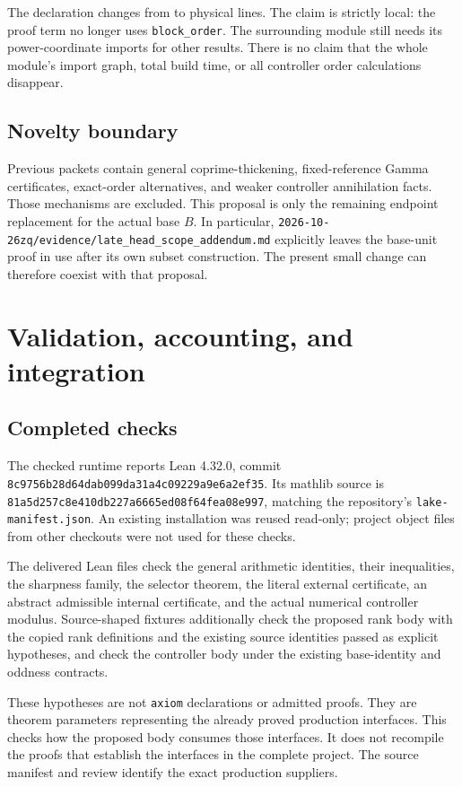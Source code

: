 \documentclass[11pt]{article}
\newcommand{\code}[1]{\nolinkurl{#1}}
\begin{document}
The declaration changes from \UnitOld{} to \UnitNew{} physical lines. The
claim is strictly local: the proof term no longer uses \code{block_order}.
The surrounding module still needs its power-coordinate imports for other
results. There is no claim that the whole module's import graph, total build
time, or all controller order calculations disappear.

\subsection{Novelty boundary}

Previous packets contain general coprime-thickening, fixed-reference Gamma
certificates, exact-order alternatives, and weaker controller annihilation
facts. Those mechanisms are excluded. This proposal is only the remaining
endpoint replacement for the actual base $B$. In particular,
\code{2026-10-26zq/evidence/late_head_scope_addendum.md} explicitly leaves the
base-unit proof in use after its own subset construction. The present small
change can therefore coexist with that proposal.

\section{Validation, accounting, and integration}

\subsection{Completed checks}

The checked runtime reports Lean 4.32.0, commit
\code{8c9756b28d64dab099da31a4c09229a9e6a2ef35}. Its mathlib source is
\code{81a5d257c8e410db227a6665ed08f64fea08e997}, matching the repository's
\code{lake-manifest.json}. An existing installation was reused read-only;
project object files from other checkouts were not used for these checks.

The delivered Lean files check the general arithmetic identities, their
inequalities, the sharpness family, the selector theorem, the literal
external certificate, an abstract admissible internal certificate, and the
actual numerical controller modulus. Source-shaped fixtures additionally
check the proposed rank body with the copied rank definitions and the
existing source identities passed as explicit hypotheses, and check the
controller body under the existing base-identity and oddness contracts.

These hypotheses are not \code{axiom} declarations or admitted proofs. They
are theorem parameters representing the already proved production interfaces.
This checks how the proposed body consumes those interfaces. It does not
recompile the proofs that establish the interfaces in the complete project.
The source manifest and review identify the exact production suppliers.
\end{document}

